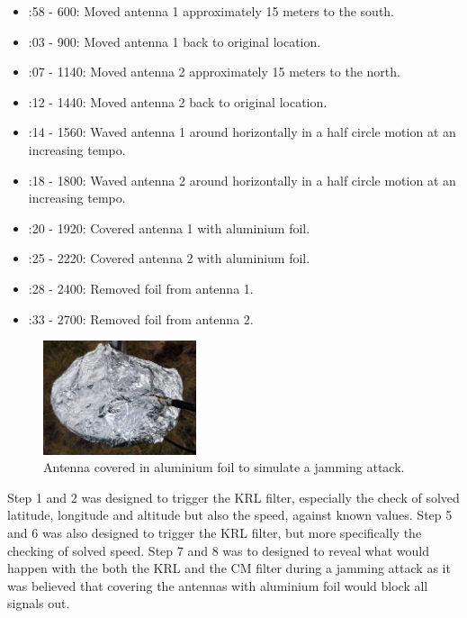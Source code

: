 \documentclass[12pt,english,a4paper]{report}
\begin{document}
\begin{itemize}
  \item{}:58 - 600: Moved antenna 1 approximately 15 meters to the south.
  \item{}:03 - 900: Moved antenna 1 back to original location.
  \item{}:07 - 1140: Moved antenna 2 approximately 15 meters to the north.
  \item{}:12 - 1440: Moved antenna 2 back to original location.
  \item{}:14 - 1560: Waved antenna 1 around horizontally in a half circle motion at an increasing tempo.
  \item{}:18 - 1800: Waved antenna 2 around horizontally in a half circle motion at an increasing tempo.
  \item{}:20 - 1920: Covered antenna 1 with aluminium foil.
  \item{}:25 - 2220: Covered antenna 2 with aluminium foil.
  \item{}:28 - 2400: Removed foil from antenna 1.
  \item{}:33 - 2700: Removed foil from antenna 2.
\end{itemize}
\newpage

\begin{figure}
  \centering
  \includegraphics[width=0.40\textwidth]{antenna_foil_cover.jpg}
  \caption[Antenna covered in aluminium foil]
   {Antenna covered in aluminium foil to simulate a jamming attack.}
\end{figure} 

Step 1 and 2 was designed to trigger the KRL filter, especially the check of solved latitude, longitude and altitude but also the speed, against known values. Step 5 and 6 was also designed to trigger the KRL filter, but more specifically the checking of solved speed. Step 7 and 8 was to designed to reveal what would happen with the both the KRL and the CM filter during a jamming attack as it was believed that covering the antennas with aluminium foil would block all signals out.
\end{document}
